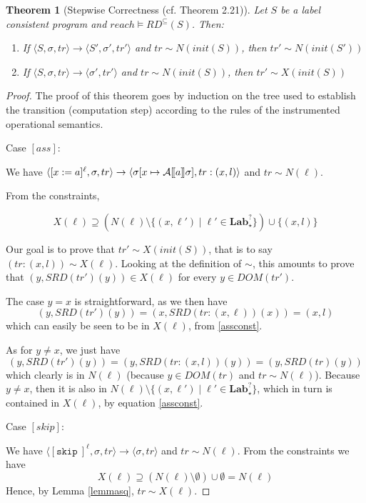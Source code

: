 \documentclass[a4wide,12pt]{article}
\theoremstyle{definition}
\theoremstyle{plain}
\newtheorem{theo}{Theorem}
\theoremstyle{remark}
\def\A#1{\mathcal{A}[\hspace{-1pt}[#1]\hspace{-1pt}]}
\def\const#1{\mathopen{\langle}#1\mathclose{\rangle}} %
\def\pair#1{\const{#1}}
\def\Lab {\mathbf{Lab}}
\def\skip {\texttt{skip}\ }
\begin{document}
\begin{theo}[Stepwise Correctness (cf. Theorem 2.21)]
\label{theo221}
Let $S$ be a label consistent program and $reach \models RD^{\subseteq}(S)$. Then:
\begin{enumerate}
\item If $\pair{S,\sigma, tr} \to \pair{S', \sigma', tr'}$ and $tr \sim N(init(S))$, then $tr' \sim N(init(S'))$
\item If $\pair{S,\sigma, tr} \to \pair{\sigma', tr'}$ and $tr \sim N(init(S))$, then $tr' \sim X(init(S))$
\end{enumerate}
\end{theo}
\begin{proof}
The proof of this theorem goes by induction on the tree used to establish
the transition (computation step) according to the rules of the instrumented operational semantics.

Case $[ass]$:

We have $\pair{[x := a]^\ell, \sigma, tr} \to \pair{\sigma[x\mapsto\A{a}\sigma], tr:(x,l)}$
and $tr \sim N(\ell)$. 


From the constraints,

\begin{equation}\label{assconst}
X(\ell) \supseteq (N(\ell) \setminus \{(x,\ell') \mid \ell' \in \Lab_\star^?\}) \cup \{(x,l)\}
\end{equation}

Our goal is to prove that $tr' \sim X(init(S))$, that is to say $(tr:(x,l)) \sim X(\ell)$.
Looking at the definition of $\sim$,
this amounts to prove that $(y,SRD(tr')(y)) \in X(\ell)$ for every $y \in DOM(tr')$.

The case $y=x$ is straightforward, as
we then have \[(y,SRD(tr')(y)) = (x,SRD(tr:(x,\ell))(x)) = (x,l)\] which can easily be seen to be in $X(\ell)$, from \ref{assconst}.

As for $y\neq x$, we just have \[(y,SRD(tr')(y)) = (y,SRD(tr:(x,l))(y)) = (y,SRD(tr)(y))\] which clearly is in $N(\ell)$ (because $y \in DOM(tr)$ and $tr \sim N(\ell)$).
Because $y\neq x$, then it is also in $N(\ell) \setminus \{(x,\ell') \mid \ell' \in \Lab_\star^?\}$, which in turn is contained in $X(\ell)$, by equation \ref{assconst}.


Case $[skip]$:

We have $\pair{[\skip]^\ell, \sigma, tr} \to \pair{\sigma, tr}$
and $tr \sim N(\ell)$. 
From the constraints we have
\[X(\ell) \supseteq (N(\ell) \setminus \emptyset) \cup \emptyset = N(\ell)\]
Hence, by Lemma \ref{lemmasq}, $tr \sim X(\ell)$.


\end{proof}
\end{document}
